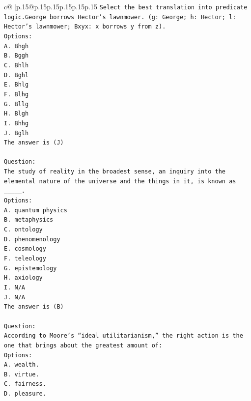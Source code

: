 \documentclass{article}
\begin{document}
{\begin{supertabular}{c@{$\;$}|p{.15\linewidth}@{}p{.15\linewidth}p{.15\linewidth}p{.15\linewidth}p{.15\linewidth}p{.15\linewidth}}
{{{\texttt{Select the best translation into predicate logic.George borrows Hector's lawnmower. (g: George; h: Hector; l: Hector's lawnmower; Bxyx: x borrows y from z).} \\
\texttt{Options:} \\
\texttt{A. Bhgh} \\
\texttt{B. Bggh} \\
\texttt{C. Bhlh} \\
\texttt{D. Bghl} \\
\texttt{E. Bhlg} \\
\texttt{F. Blhg} \\
\texttt{G. Bllg} \\
\texttt{H. Blgh} \\
\texttt{I. Bhhg} \\
\texttt{J. Bglh} \\
\texttt{The answer is (J)} \\
\\ 
\texttt{Question:} \\
\texttt{The study of reality in the broadest sense, an inquiry into the elemental nature of the universe and the things in it, is known as \_\_\_\_\_.} \\
\texttt{Options:} \\
\texttt{A. quantum physics} \\
\texttt{B. metaphysics} \\
\texttt{C. ontology} \\
\texttt{D. phenomenology} \\
\texttt{E. cosmology} \\
\texttt{F. teleology} \\
\texttt{G. epistemology} \\
\texttt{H. axiology} \\
\texttt{I. N/A} \\
\texttt{J. N/A} \\
\texttt{The answer is (B)} \\
\\ 
\texttt{Question:} \\
\texttt{According to Moore’s “ideal utilitarianism,” the right action is the one that brings about the greatest amount of:} \\
\texttt{Options:} \\
\texttt{A. wealth.} \\
\texttt{B. virtue.} \\
\texttt{C. fairness.} \\
\texttt{D. pleasure.} \\
}}}
\end{supertabular}}
\end{document}
